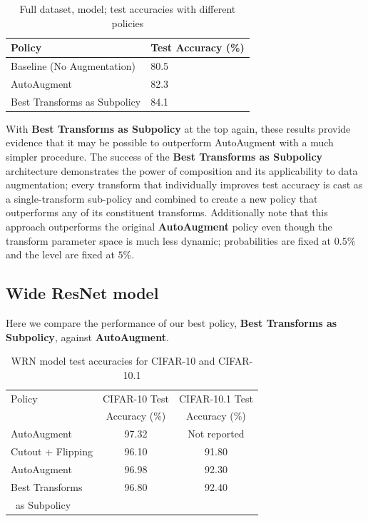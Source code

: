 \documentclass[10pt,twocolumn,letterpaper]{article}
\begin{document}
    \begin{table}[h]
    \begin{tabular}{l|l}
    \hline
    Policy                          &Test Accuracy (\%)   \\ \hline
    Baseline (No Augmentation)      &80.5 \\
    AutoAugment                     &82.3 \\
    Best Transforms as Subpolicy    &84.1 \\
    \end{tabular}
    \caption{Full dataset, model; test accuracies with different policies}
    \end{table}

    With \textbf{Best Transforms as Subpolicy} at the top again, these results provide evidence that it may be possible to outperform AutoAugment with a much simpler procedure. The success of the \textbf{Best Transforms as Subpolicy} architecture demonstrates the power of composition and its applicability to data augmentation; every transform that individually improves test accuracy is cast as a single-transform sub-policy and combined to create a new policy that outperforms any of its constituent transforms. Additionally note that this approach outperforms the original \textbf{AutoAugment} policy even though the transform parameter space is much less dynamic; probabilities are fixed at $0.5\%$ and the level are fixed at $5\%$.

  \subsection{Wide ResNet model}

    Here we compare the performance of our best policy, \textbf{Best Transforms as Subpolicy}, against \textbf{AutoAugment}.

    \begin{table}[h]
      \begin{tabular}{l|c|c}
        \hline
        Policy  &CIFAR-10 Test  &CIFAR-10.1 Test  \\
                &Accuracy (\%)  &Accuracy (\%) \\ \hline
        AutoAugment\cite{Cubuk2018} & 97.32 & Not reported \\
        Cutout + Flipping                 & 96.10 & 91.80 \\
        AutoAugment			        & 96.98 & 92.30 \\
        Best Transforms 			&96.80	&92.40 \\
        \, as Subpolicy			    &		&	 \\
        
      \end{tabular}
      \caption{WRN model \cite{Zagoruyko2016} test accuracies for CIFAR-10 and CIFAR-10.1}
    \end{table}
\end{document}
